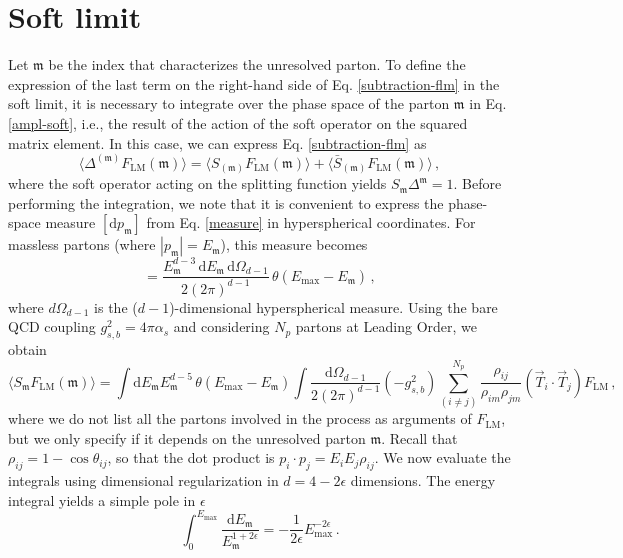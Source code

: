 \documentclass[a4paper, 12pt]{book}
\newcommand{\um}{\mathfrak{m}}
\begin{document}
\section{Soft limit}
Let $\um$ be the index that characterizes the unresolved parton. To define the expression of the last term on the right-hand side of Eq. \ref{subtraction-flm} in the soft limit, it is necessary to integrate over the phase space of the parton $\um$ in Eq. \ref{ampl-soft}, i.e., the result of the action of the soft operator on the squared matrix element. In this case, we can express Eq. \ref{subtraction-flm} as
\begin{equation}
  \langle \Delta^{(\um)}F_{\mathrm{LM}}(\um) \rangle = \langle S_{(\um)}F_{\mathrm{LM}}(\um) \rangle + \langle \bar{S}_{(\um)}F_{\mathrm{LM}}(\um) \rangle \, ,
  \label{soft-limit-sum}
\end{equation}
where the soft operator acting on the splitting function yields  $S_\um \Delta^{\um} = 1$. Before performing the integration, we note that it is convenient to express the phase-space measure $[\mathrm{d}p_\um]$ from Eq. \ref{measure} in hyperspherical coordinates. For massless partons (where $|p_\um|=E_\um$), this measure becomes
\begin{equation}
  [\mathrm{d}p_\um] = \frac{E_\um^{d-3} \,\mathrm{d}E_\um  \, \mathrm{d}\Omega_{d-1}}{2 (2 \pi)^{d-1}} \, \theta(E_{\mathrm{max}}-E_\um) \, ,
  \label{measure-ps}
\end{equation}
where ${d}\Omega_{d-1}$ is the ($d-1$)-dimensional hyperspherical measure. Using the bare QCD coupling $g_{s,b}^2 = 4\pi\alpha_s$ and considering $N_p$ partons at Leading Order, we obtain
\begin{equation}
  \langle S_\um F_{\mathrm{LM}} (\um) \rangle = \int \mathrm{d}E_\um E_\um^{d-5} \, \theta(E_{\mathrm{max}}-E_\um)  \int \frac{\mathrm{d}\Omega_{d-1}}{2 (2 \pi)^{d-1}} (-g_{s,b}^2) \sum_{(i \neq j)}^{N_p} \frac{\rho_{ij}}{\rho_{im}\rho_{jm}} (\vec{T}_i \cdot \vec{T}_j) F_{\mathrm{LM}} \, ,
\end{equation}
where we do not list all the partons involved in the process as arguments of $F_{\mathrm{LM}}$, but we only 
specify if it depends on the unresolved parton $\um$. Recall that $\rho_{ij} = 1 - \cos\theta_{ij}$, so that the dot product is $p_i \cdot p_j = E_i E_j \rho_{ij}$. We now evaluate the integrals using dimensional regularization in $d=4-2\epsilon$ dimensions. The energy integral yields a simple pole in $\epsilon$
\begin{equation}
  \int_0^{E_{\mathrm{max}}} \frac{\mathrm{d}E_\um}{ E_\um^{1+2\epsilon}} = - \frac{1}{2 \epsilon} E_{\mathrm{max}}^{-2 \epsilon} \, .
\end{equation}
\end{document}
